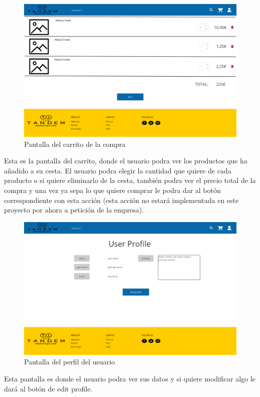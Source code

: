 \documentclass{article}
\begin{document}
\newpage
\begin{figure}[h]
    \centering
    \includegraphics[scale=0.25]{mockup/cart.png}
    \caption{Pantalla del carrito de la compra}
    \label{Fig:cart}
\end{figure}
\quad Esta es la pantalla del carrito, donde el usuario podra ver los productos que ha añadido a su cesta. El usuario podra elegir la cantidad que quiere de cada producto o si quiere eliminarlo de la cesta, también podra ver el precio total de la compra y una vez ya sepa lo que quiere comprar le podra dar al botón correspondiente con esta acción (esta acción no estará implementada en este proyecto por ahora a petición de la empresa).

\begin{figure}[h]
    \centering
    \includegraphics[scale=0.25]{mockup/Profile.png}
    \caption{Pantalla del perfil del usuario}
    \label{Fig:Profile}
\end{figure}
\quad Esta pantalla es donde el usuario podra ver sus datos y si quiere modificar algo le dará al botón de edit profile.
\end{document}
